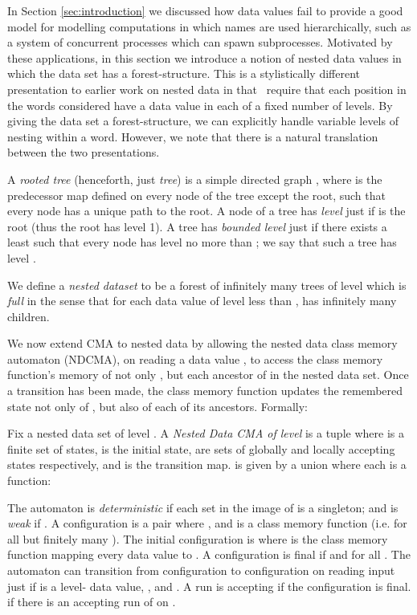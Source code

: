 

In Section \ref{sec:introduction} we discussed how data values fail to provide a good model for modelling computations in which names are used hierarchically, such as a system of concurrent processes which can spawn subprocesses.
Motivated by these applications, in this section we introduce a notion of nested data values in which the data set has a forest-structure.  This is a stylistically different presentation 
to earlier work on nested data in that~\cite{bjorklund10,Decker14} require that each position in the words considered have a data value in each of a fixed number of levels.  By giving the data set a forest-structure, we can explicitly handle variable levels of nesting within a word.  However, we note that there is a natural translation between the two presentations.



\begin{definition}
A \emph{rooted tree} (henceforth, just \emph{tree}) is a simple directed graph , where  is the predecessor map defined on every node of the tree except the root, such that every node has a unique path to the root. A node  of a tree has \emph{level}  just if  is the root (thus the root has level 1). A tree has \emph{bounded level} just if there exists a least  such that every node has level no more than ; we say that such a tree has level .

We define a \emph{nested dataset}  to be a forest of infinitely many trees of level  which is \emph{full} in the sense that for each data value  of level less than , 
 has infinitely many children.
\end{definition}



We now extend CMA to nested data by allowing the nested data class memory automaton (NDCMA), on reading a data value , to access the class memory function's memory of not only , but each ancestor of  in the nested data set.  Once a transition has been made, the class memory function updates the remembered state not only of , but also of each of its ancestors.  Formally:



\begin{definition}
Fix a nested data set of level .  A \emph{Nested Data CMA of level } is a tuple  where  is a finite set of states,  is the initial state,  are sets of globally and locally accepting states respectively, and  is the transition map.   is given by a union  where each  is a function:

The automaton is \emph{deterministic} if each set in the image of  is a singleton; and is \emph{weak} if .
A configuration is a pair  where , and  is a class memory function (i.e.  for all but finitely many ).  The initial configuration is  where  is the class memory function mapping every data value to .  A configuration  is final if  and  for all .
The automaton can transition from configuration  to configuration  on reading input  just if  is a level- data value, , and .
A run  is accepting if the configuration  is final.   if there is an accepting run of  on .
\end{definition}

